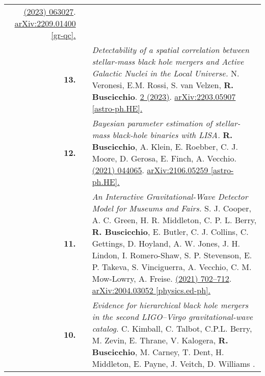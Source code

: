 {\begin{longtable}{rp{0.3cm}p{15.8cm}}
\newline{}
\href{https://journals.aps.org/prd/abstract/10.1103/PhysRevD.107.063027}{\prd 107 (2023) 063027}. \href{https://arxiv.org/abs/2209.01400}{arXiv:2209.01400 [gr-qc].}
\vspace{0.09cm}\\
%
\textbf{13.} & & \textit{Detectability of a spatial correlation between stellar-mass black hole mergers and Active Galactic Nuclei in the Local Universe.}
\newline{}
N. Veronesi, E.M. Rossi, S. van Velzen, \textbf{R. Buscicchio}.
\newline{}
\href{https://academic.oup.com/mnras/article/514/2/2092/6587069}{\mnras 514 2 (2023)}. \href{https://arxiv.org/abs/2203.05907}{arXiv:2203.05907 [astro-ph.HE].}
\vspace{0.09cm}\\
%
\textbf{12.} & & \textit{Bayesian parameter estimation of stellar-mass black-hole binaries with LISA.}
\newline{}
\textbf{R. Buscicchio}, A. Klein, E. Roebber, C. J. Moore, D. Gerosa, E. Finch, A. Vecchio.
\newline{}
\href{https://journals.aps.org/prd/abstract/10.1103/PhysRevD.104.044065}{\prd 104 (2021) 044065}. \href{https://arxiv.org/abs/2106.05259}{arXiv:2106.05259 [astro-ph.HE].}
\vspace{0.09cm}\\
%
\textbf{11.} & & \textit{An Interactive Gravitational-Wave Detector Model for Museums and Fairs.}
\newline{}
S. J. Cooper, A. C. Green, H. R. Middleton, C. P. L. Berry, \textbf{R. Buscicchio}, E. Butler, C. J. Collins, C. Gettings, D. Hoyland, A. W. Jones, J. H. Lindon, I. Romero-Shaw, S. P. Stevenson, E. P. Takeva, S. Vinciguerra, A. Vecchio, C. M. Mow-Lowry, A. Freise.
\newline{}
\href{https://pubs.aip.org/aapt/ajp/article/89/7/702/1056907/An-interactive-gravitational-wave-detector-model}{\ajp 89 (2021) 702–712}. \href{https://arxiv.org/abs/2004.03052}{arXiv:2004.03052 [physics.ed-ph].}
\vspace{0.09cm}\\
%
\textbf{10.} & & \textit{Evidence for hierarchical black hole mergers in the second LIGO--Virgo gravitational-wave catalog.}
\newline{}
C. Kimball, C. Talbot, C.P.L. Berry, M. Zevin, E. Thrane, V. Kalogera, \textbf{R. Buscicchio}, M. Carney, T. Dent, H. Middleton, E. Payne, J. Veitch, D. Williams .
\newline{}

\end{longtable}}
